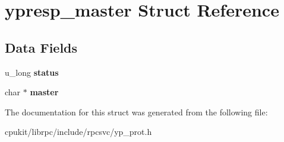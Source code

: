 \hypertarget{structypresp__master}{}\section{ypresp\+\_\+master Struct Reference}
\label{structypresp__master}
\subsection*{Data Fields}
\begin{DoxyCompactItemize}
\item 
\mbox{\label{structypresp__master_af36e3eff5228cf08ef07575eb94ef6b3}} 
u\+\_\+long {\bfseries status}
\item 
\mbox{\label{structypresp__master_a5b33ff82b56c626a3b745184579d1e6a}} 
char $\ast$ {\bfseries master}
\end{DoxyCompactItemize}


The documentation for this struct was generated from the following file\+:\begin{DoxyCompactItemize}
\item 
cpukit/librpc/include/rpcsvc/yp\+\_\+prot.\+h\end{DoxyCompactItemize}
